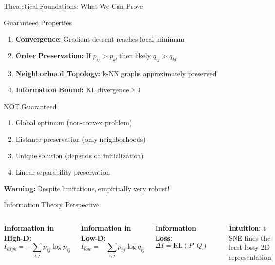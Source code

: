 \documentclass[aspectratio=169]{beamer}
\newcommand{\warning}[1]{\colorbox{red!10}{\textcolor{warningcolor}{\textbf{Warning:} #1}}}
\newcommand{\intuition}[1]{\colorbox{green!10}{\textcolor{intuitioncolor}{\textbf{Intuition:} #1}}}
\begin{document}
\begin{frame}{Theoretical Foundations: What We Can Prove}
\begin{block}{Guaranteed Properties}
\begin{enumerate}
\item \textbf{Convergence:} Gradient descent reaches local minimum
\item \textbf{Order Preservation:} If $p_{ij} > p_{kl}$ then likely $q_{ij} > q_{kl}$
\item \textbf{Neighborhood Topology:} k-NN graphs approximately preserved
\item \textbf{Information Bound:} KL divergence ≥ 0
\end{enumerate}
\end{block}

\begin{block}{NOT Guaranteed}
\begin{enumerate}
\item Global optimum (non-convex problem)
\item Distance preservation (only neighborhoods)
\item Unique solution (depends on initialization)
\item Linear separability preservation
\end{enumerate}
\end{block}

\warning{Despite limitations, empirically very robust!}
\end{frame}

\begin{frame}{Information Theory Perspective}
\begin{columns}
\textbf{Information in High-D:}
$$I_{high} = -\sum_{i,j} p_{ij}\log p_{ij}$$

\textbf{Information in Low-D:}
$$I_{low} = -\sum_{i,j} p_{ij}\log q_{ij}$$

\textbf{Information Loss:}
$$\Delta I = \text{KL}(P||Q)$$

\includegraphics[width=\textwidth]{./Figures/information_loss_diagram.png}

\intuition{t-SNE finds the least lossy 2D representation}
\end{columns}
\end{frame}
\end{document}
